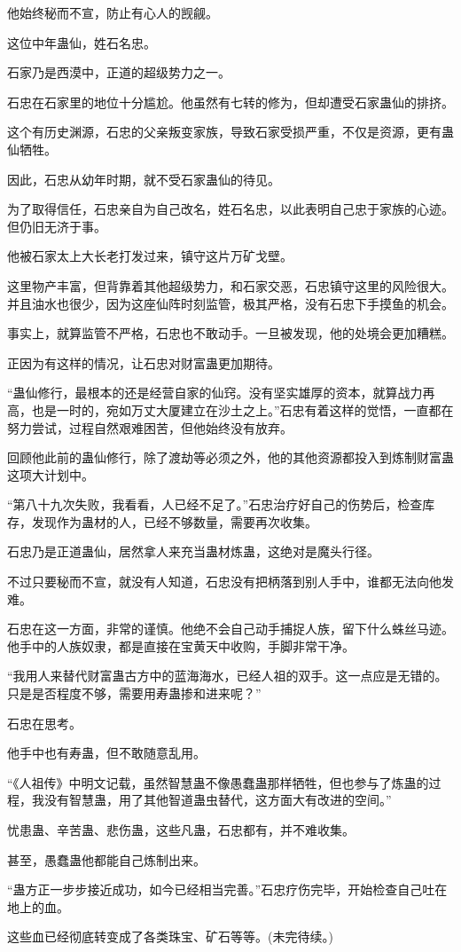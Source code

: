 \begin{this_body}
他始终秘而不宣，防止有心人的觊觎。

这位中年蛊仙，姓石名忠。

石家乃是西漠中，正道的超级势力之一。

石忠在石家里的地位十分尴尬。他虽然有七转的修为，但却遭受石家蛊仙的排挤。

这个有历史渊源，石忠的父亲叛变家族，导致石家受损严重，不仅是资源，更有蛊仙牺牲。

因此，石忠从幼年时期，就不受石家蛊仙的待见。

为了取得信任，石忠亲自为自己改名，姓石名忠，以此表明自己忠于家族的心迹。但仍旧无济于事。

他被石家太上大长老打发过来，镇守这片万矿戈壁。

这里物产丰富，但背靠着其他超级势力，和石家交恶，石忠镇守这里的风险很大。并且油水也很少，因为这座仙阵时刻监管，极其严格，没有石忠下手摸鱼的机会。

事实上，就算监管不严格，石忠也不敢动手。一旦被发现，他的处境会更加糟糕。

正因为有这样的情况，让石忠对财富蛊更加期待。

“蛊仙修行，最根本的还是经营自家的仙窍。没有坚实雄厚的资本，就算战力再高，也是一时的，宛如万丈大厦建立在沙土之上。”石忠有着这样的觉悟，一直都在努力尝试，过程自然艰难困苦，但他始终没有放弃。

回顾他此前的蛊仙修行，除了渡劫等必须之外，他的其他资源都投入到炼制财富蛊这项大计划中。

“第八十九次失败，我看看，人已经不足了。”石忠治疗好自己的伤势后，检查库存，发现作为蛊材的人，已经不够数量，需要再次收集。

石忠乃是正道蛊仙，居然拿人来充当蛊材炼蛊，这绝对是魔头行径。

不过只要秘而不宣，就没有人知道，石忠没有把柄落到别人手中，谁都无法向他发难。

石忠在这一方面，非常的谨慎。他绝不会自己动手捕捉人族，留下什么蛛丝马迹。他手中的人族奴隶，都是直接在宝黄天中收购，手脚非常干净。

“我用人来替代财富蛊古方中的蓝海海水，已经人祖的双手。这一点应是无错的。只是是否程度不够，需要用寿蛊掺和进来呢？”

石忠在思考。

他手中也有寿蛊，但不敢随意乱用。

“《人祖传》中明文记载，虽然智慧蛊不像愚蠢蛊那样牺牲，但也参与了炼蛊的过程，我没有智慧蛊，用了其他智道蛊虫替代，这方面大有改进的空间。”

忧患蛊、辛苦蛊、悲伤蛊，这些凡蛊，石忠都有，并不难收集。

甚至，愚蠢蛊他都能自己炼制出来。

“蛊方正一步步接近成功，如今已经相当完善。”石忠疗伤完毕，开始检查自己吐在地上的血。

这些血已经彻底转变成了各类珠宝、矿石等等。(未完待续。)

\end{this_body}

